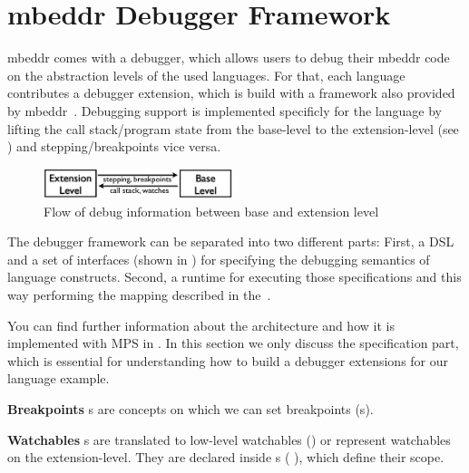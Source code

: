 \section{mbeddr Debugger Framework}
\label{mbeddrDebugger}
\label{mbeddrDebuggerFramework}

mbeddr comes with a debugger, which allows users to debug their mbeddr code 
on the abstraction levels of the used languages. For that, each language
contributes a debugger extension, which is build with a framework also provided
by mbeddr~\cite{DBLP:conf/adaEurope/AdaEuropeDeb}.
Debugging support is implemented specificly for the language by
lifting the call stack/program state from the base-level to the
extension-level (see ) and stepping/breakpoints
vice versa.

\begin{figure}[h]
  \vspace{-2mm}
  \centering
    \includegraphics[width=5.5cm]{./figures/two-levels.png} 
    \vspace{-2mm}
    \caption{Flow of debug information between base and
    extension level~\cite{DBLP:conf/adaEurope/AdaEuropeDeb}}
  \label{infoFlow}
  \vspace{-2mm}
\end{figure}



The debugger framework can be separated into two different parts: First, a
\ac{DSL} and a set of interfaces (shown in ) for specifying the
debugging semantics of language constructs. 
Second, a runtime for executing those specifications and
this way performing the mapping described in the~. 

You can find further information about the architecture and how it is
implemented with \ac{MPS} in \cite{DBLP:conf/adaEurope/AdaEuropeDeb}. In this
section we only discuss the specification part, which is essential for
understanding how to build a debugger extensions for our language example.

\noindent \textbf{Breakpoints} s are concepts on which
we can set breakpoints (\eg {}s).

\noindent \textbf{Watchables} s are
translated to low-level watchables (\eg {}) or
represent watchables on the extension-level.
They are declared inside s (\eg
{}), which define their scope.

